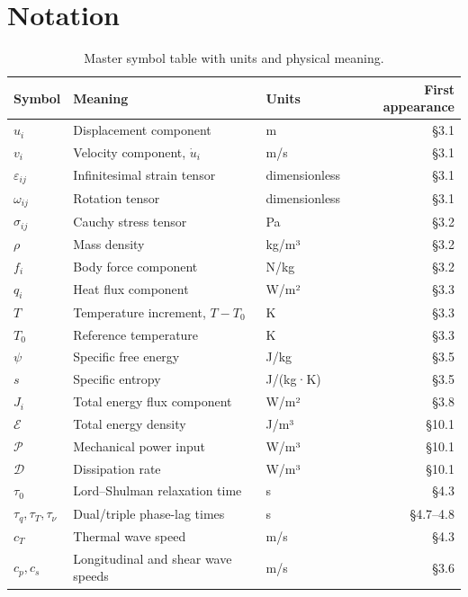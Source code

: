\section*{Notation}

\begin{table}[h]
\centering
\small
\caption{Master symbol table with units and physical meaning.}
\label{tab:notation}
\begin{tabularx}{\textwidth}{@{}lXlr@{}}
\toprule
\textbf{Symbol} & \textbf{Meaning} & \textbf{Units} & \textbf{First appearance} \\
\midrule
$u_i$ & Displacement component & m & §3.1 \\
$v_i$ & Velocity component, $\dot{u}_i$ & m/s & §3.1 \\
$\varepsilon_{ij}$ & Infinitesimal strain tensor & dimensionless & §3.1 \\
$\omega_{ij}$ & Rotation tensor & dimensionless & §3.1 \\
$\sigma_{ij}$ & Cauchy stress tensor & Pa & §3.2 \\
$\rho$ & Mass density & kg/m³ & §3.2 \\
$f_i$ & Body force component & N/kg & §3.2 \\
$q_i$ & Heat flux component & W/m² & §3.3 \\
$T$ & Temperature increment, $T - T_0$ & K & §3.3 \\
$T_0$ & Reference temperature & K & §3.3 \\
$\psi$ & Specific free energy & J/kg & §3.5 \\
$s$ & Specific entropy & J/(kg·K) & §3.5 \\
$J_i$ & Total energy flux component & W/m² & §3.8 \\
$\mathcal{E}$ & Total energy density & J/m³ & §10.1 \\
$\mathcal{P}$ & Mechanical power input & W/m³ & §10.1 \\
$\mathcal{D}$ & Dissipation rate & W/m³ & §10.1 \\
$\tau_0$ & Lord--Shulman relaxation time & s & §4.3 \\
$\tau_q, \tau_T, \tau_\nu$ & Dual/triple phase-lag times & s & §4.7--4.8 \\
$c_T$ & Thermal wave speed & m/s & §4.3 \\
$c_p, c_s$ & Longitudinal and shear wave speeds & m/s & §3.6 \\

\end{tabularx}
\end{table}

